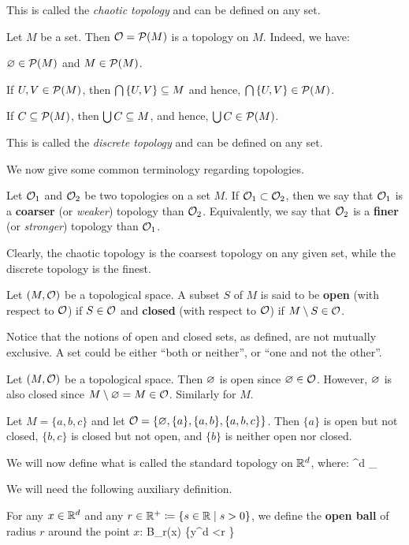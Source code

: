 This is called the \emph{chaotic topology} and can be defined on any set.
\ee

\be
Let $M$ be a set. Then $\mathcal{O}=\mathcal{P}(M)$ is a topology on $M$. Indeed, we have:
\ben
\item[i)] $\varnothing \in \mathcal{P}(M)$ and $M \in \mathcal{P}(M)$.
\item[ii)] If $U,V \in \mathcal{P}(M)$, then $\bigcap\, \{U,V\} \subseteq M$ and hence, $\bigcap\, \{U,V\} \in \mathcal{P}(M)$.
\item[iii)] If $C\subseteq\mathcal{P}(M)$, then $\bigcup C \subseteq M$, and hence, $\bigcup C\in \mathcal{P}(M)$.
\een

This is called the \emph{discrete topology} and can be defined on any set.
\ee

We now give some common terminology regarding topologies.

Let $\mathcal{O}_1$ and $\mathcal{O}_2$ be two topologies on a set $M$. If $\mathcal{O}_1 \subset \mathcal{O}_2$, then we say that $\mathcal{O}_1$ is a
\textbf{coarser} (or \emph{weaker}) topology than $\mathcal{O}_2$. Equivalently, we say that $\mathcal{O}_2$ is a \textbf{finer} (or
\emph{stronger}) topology than $\mathcal{O}_1$.
\ed

Clearly, the chaotic topology is the coarsest topology on any given set, while the discrete topology is the finest.

Let $(M,\mathcal{O})$ be a topological space. A subset $S$ of $M$ is said to be \textbf{open} (with respect to $\mathcal{O}$) if $S
\in \mathcal{O}$ and \textbf{closed} (with respect to $\mathcal{O}$) if $M\setminus S \in \mathcal{O}$.
\ed

Notice that the notions of open and closed sets, as defined, are not mutually exclusive. A set could be either ``both or
neither'', or ``one and not the other''.

\be
Let $(M,\mathcal{O})$ be a topological space. Then $\varnothing$ is open since $\varnothing \in \mathcal{O}$. However, $\varnothing$ is also closed since
$M\setminus \varnothing = M \in \mathcal{O}$. Similarly for $M$.
\ee

\be
Let $M = \{a,b,c\}$ and let $\mathcal{O}=\{\varnothing,\{a\},\{a,b\},\{a,b,c\}\}$. Then $\{a\}$ is open but not closed, $\{b,c\}$ is
closed but not open, and $\{b\}$ is neither open nor closed.
\ee

We will now define what is called the standard topology on $\mathbb{R}^d$, where:
\bse
\R^d \coloneqq \underbrace{\R\times\R\times\cdots\times\R}_
\ese

We will need the following auxiliary definition.

For any $x\in\mathbb{R}^d$ and any $r \in \mathbb{R}^+ \coloneqq \{s\in\mathbb{R}\mid s>0\}$, we define the \textbf{open ball} of radius $r$
around the point $x$:
\bse
B_r(x) \coloneqq \bigl\{y\in \R^d \mid \textstyle{} <r \bigr\}
\ese


